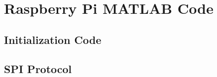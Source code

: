 \chapter{Raspberry Pi MATLAB Code}

\section{Initialization Code}
\label{ch:RPI3_SPI_Int}


\section{SPI Protocol}
\label{ch:RPI3_SPI_Int}



